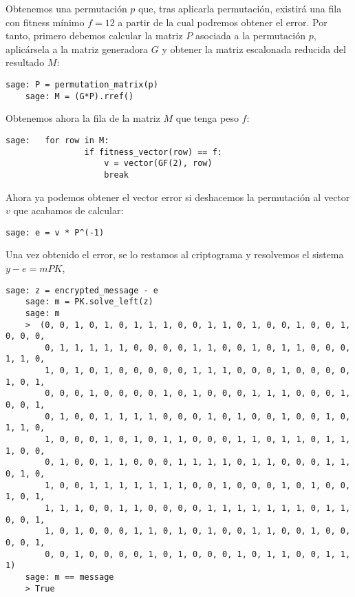 \begin{exampleth}
    Obtenemos una permutación $p$ que, tras aplicarla permutación, existirá una fila con fitness mínimo $f = 12$ a partir de la cual podremos obtener el error. Por tanto, primero debemos calcular la matriz $P$ asociada a la permutación $p$, aplicársela a la matriz generadora $G$ y obtener la matriz escalonada reducida del resultado $M$:

    \begin{lstlisting}[gobble=4]
    sage: P = permutation_matrix(p)
    sage: M = (G*P).rref()
    \end{lstlisting}

    Obtenemos ahora la fila de la matriz $M$ que tenga peso $f$:

    \begin{lstlisting}[gobble=4]
    sage:   for row in M:
                if fitness_vector(row) == f:
                    v = vector(GF(2), row)
                    break
    \end{lstlisting}
    
    Ahora ya podemos obtener el vector error si deshacemos la permutación al vector $v$ que acabamos de calcular:

    \begin{lstlisting}[gobble=4]
    sage: e = v * P^(-1)
    \end{lstlisting}

    Una vez obtenido el error, se lo restamos al criptograma y resolvemos el sistema $y - e = mPK$,

    \begin{lstlisting}[gobble=4]
    sage: z = encrypted_message - e
    sage: m = PK.solve_left(z)
    sage: m
    >  (0, 0, 1, 0, 1, 0, 1, 1, 1, 0, 0, 1, 1, 0, 1, 0, 0, 1, 0, 0, 1, 0, 0, 0, 
        0, 1, 1, 1, 1, 1, 0, 0, 0, 0, 1, 1, 0, 0, 1, 0, 1, 1, 0, 0, 0, 1, 1, 0, 
        1, 0, 1, 0, 1, 0, 0, 0, 0, 0, 1, 1, 1, 0, 0, 0, 1, 0, 0, 0, 0, 1, 0, 1, 
        0, 0, 0, 1, 0, 0, 0, 0, 1, 0, 1, 0, 0, 0, 1, 1, 1, 0, 0, 0, 1, 0, 0, 1, 
        0, 1, 0, 0, 1, 1, 1, 1, 0, 0, 0, 1, 0, 1, 0, 0, 1, 0, 0, 1, 0, 1, 1, 0, 
        1, 0, 0, 0, 1, 0, 1, 0, 1, 1, 0, 0, 0, 1, 1, 0, 1, 1, 0, 1, 1, 1, 0, 0, 
        0, 1, 0, 0, 1, 1, 0, 0, 0, 1, 1, 1, 1, 0, 1, 1, 0, 0, 0, 1, 1, 0, 1, 0, 
        1, 0, 0, 1, 1, 1, 1, 1, 1, 1, 0, 0, 1, 0, 0, 0, 1, 0, 1, 0, 0, 1, 0, 1, 
        1, 1, 1, 0, 0, 1, 1, 0, 0, 0, 0, 1, 1, 1, 1, 1, 1, 1, 0, 1, 1, 0, 0, 1, 
        1, 0, 1, 0, 0, 0, 1, 1, 0, 1, 0, 1, 0, 0, 1, 1, 0, 0, 1, 0, 0, 0, 0, 1, 
        0, 0, 1, 0, 0, 0, 0, 1, 0, 1, 0, 0, 0, 1, 0, 1, 1, 0, 0, 1, 1, 1)
    sage: m == message
    > True
    \end{lstlisting}


\end{exampleth}
